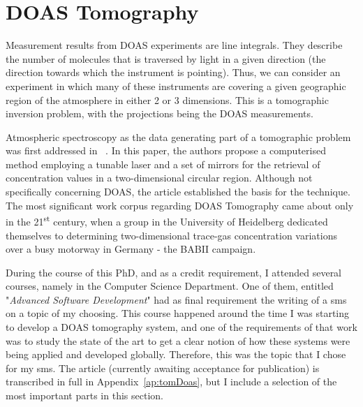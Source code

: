 \section{DOAS Tomography}%
\label{sec:doas_tomography}


Measurement results from \gls{DOAS} experiments are line integrals. They
describe the number of molecules that is traversed by light in a given
direction (the direction towards which the instrument is pointing).
Thus, we can consider an experiment in which many of these instruments
are covering a given geographic region of the atmosphere in either 2 or
3 dimensions. This is a tomographic inversion problem, with the
projections being the \gls{DOAS} measurements.

Atmospheric spectroscopy as the data generating part of a tomographic
problem was first addressed in ~. In this
paper, the authors propose a computerised method employing a tunable
laser  and a set of mirrors for the retrieval of concentration values in
a two-dimensional circular region. Although not specifically concerning
\gls{DOAS}, the article established the basis for the technique.  The
most significant work corpus regarding DOAS Tomography came about only
in the 21\textsuperscript{st} century, when a group in the University of
Heidelberg dedicated themselves to determining two-dimensional trace-gas
concentration variations over a busy motorway in Germany - the BABII
campaign. 

During the course of this PhD, and as a credit requirement, I attended
several courses, namely in the Computer Science Department. One of them,
entitled "\emph{Advanced Software Development}" had as final requirement
the writing of a \gls{sms} on a topic of my choosing. This course
happened around the time I was starting to develop a \gls{DOAS}
tomography system, and one of the requirements of that work was to study
the state of the art to get a clear notion of how these systems were
being applied and developed globally. Therefore, this was the topic that
I chose for my \gls{sms}. The article (currently awaiting acceptance for
publication) is transcribed in full in Appendix~\ref{ap:tomDoas},  but I
include a selection of the most important parts in this section.

